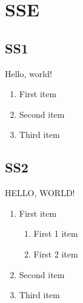 \documentclass{article}
\begin{document}
\section{SSE}
\subsection{SS1}
Hello, world!

\begin{enumerate}
  \item First item
  \item Second item
  \item Third item
\end{enumerate}

\subsection{SS2}
\makeatletter
\renewcommand\theenumi{\arabic{section}.\@arabic\c@enumi}
\renewcommand\p@enumii{\theenumi-}
\def\labelenumi{\theenumi}
\def\labelenumii{\p@enumii\Alph{enumii}}
\makeatother
HELLO, WORLD!
\begin{enumerate}
  \item First item
  \begin{enumerate}
    \item First 1 item 
    \item First 2 item
  \end{enumerate}
  \item Second item
  \item Third item
\end{enumerate}
\end{document}
